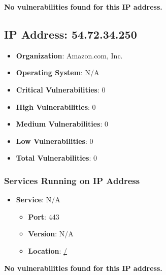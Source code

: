 \documentclass{article}
\begin{document}
\textbf{No vulnerabilities found for this IP address.}




\clearpage



\subsection{IP Address: 54.72.34.250}

\begin{itemize}
    \item \textbf{Organization}: Amazon.com, Inc.
    \item \textbf{Operating System}:  N/A 
    \item \textbf{Critical Vulnerabilities}: 0
    \item \textbf{High Vulnerabilities}: 0
    \item \textbf{Medium Vulnerabilities}: 0
    \item \textbf{Low Vulnerabilities}: 0
    \item \textbf{Total Vulnerabilities}: 0
\end{itemize}

\subsubsection*{Services Running on IP Address}

\begin{itemize}
    
        \item \textbf{Service}: N/A
        \begin{itemize}
            \item \textbf{Port}: 443
            \item \textbf{Version}:  N/A 
            \item \textbf{Location}: \href{ / }{ / }
        \end{itemize}
    
\end{itemize}


\textbf{No vulnerabilities found for this IP address.}




\clearpage
\end{document}
